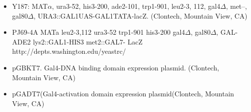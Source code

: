 \documentclass[11pt,fleqn]{book} %
\begin{document}
\begin{itemize}
    \item Y187:  MAT$\alpha$, ura3-52, his3-200, ade2-101, trp1-901, leu2-3, 112, gal4$\Delta$, met–, gal80$\Delta$, URA3::GAL1UAS-GAL1TATA-lacZ.  (Clontech, Mountain View, CA)
    \item PJ69-4A MATa leu2-3,112 ura3-52 trp1-901 his3-200 gal4$\Delta$, gal80$\Delta$, GAL-ADE2 lys2::GAL1-HIS3 met2::GAL7- LacZ   http://depts.washington.edu/yeastrc/
    \item pGBKT7.  Gal4-DNA binding domain expression plasmid. (Clontech, Mountain View, CA)
    \item pGADT7(Gal4-activation domain expression plasmid(Clontech, Mountain View, CA)
\end{itemize}




\cleardoublepage
{}
\setlength{\columnsep}{0.75cm}
\printindex

\end{document}
